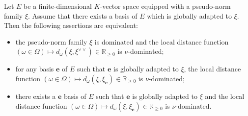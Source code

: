 \documentclass [11pt,reqno]{amsart}
\def\bR{{\mathbb{R}}}
\newcommand{\1}{\mathmybb{1}}
\begin{document}

\begin{corollary}
\label{cor:analogue_ChenMori_4.1.10}
Let $E$ be a finite-dimensional $K$-vector space equipped with a pseudo-norm family $\xi$. Assume that there exists a basis of $E$ which is globally adapted to $\xi$. Then the following assertions are equivalent: 
\begin{itemize}
	\item[(i)] the pseudo-norm family $\xi$ is dominated and the local distance function $(\omega\in\Omega) \mapsto d_{\omega}(\xi,\xi^{\vee\vee}) \in \bR_{\geq 0}$ is $\nu$-dominated;
	\item[(ii)] for any basis $\mathbf{e}$ of $E$ such that $\mathbf{e}$ is globally adapted to $\xi$, the local distance function $(\omega\in\Omega) \mapsto d_{\omega}(\xi,\xi_{\mathbf{e}})\in\bR_{\geq 0}$ is $\nu$-dominated;
	\item[(iii)] there exists a $\mathbf{e}$ basis of $E$ such that $\mathbf{e}$ is globally adapted to $\xi$ and the local distance function $(\omega\in\Omega) \mapsto d_{\omega}(\xi,\xi_{\mathbf{e}})\in\bR_{\geq 0}$ is $\nu$-dominated.
\end{itemize}
\end{corollary}
\end{document}
